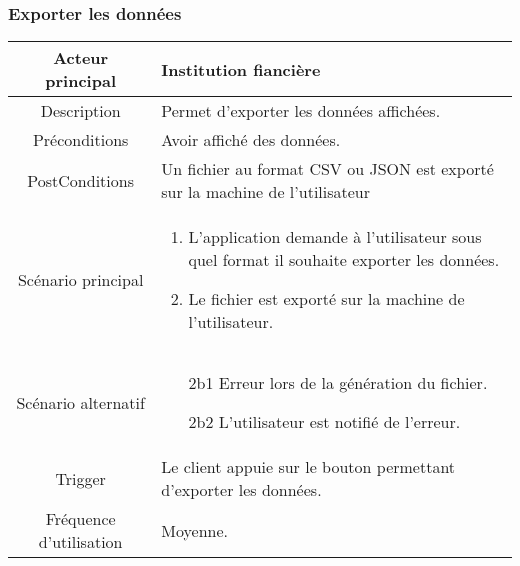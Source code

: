 \documentclass{article}
\begin{document}
\newpage

\subsubsection{Exporter les données}
\begin{table}[h]
   \begin{tabular}{|c|p{10cm}|}
      \hline
      Acteur principal&Institution fiancière\\
      \hline
      Description&Permet d'exporter les données affichées.\\
      \hline
      Préconditions&Avoir affiché des données.\\
      \hline
      PostConditions&Un fichier au format CSV ou JSON est exporté sur la machine de l'utilisateur\\
      \hline
      Scénario principal& 
            \begin{enumerate}
               \item L'application demande à l'utilisateur sous quel format il souhaite exporter les données.
               \item Le fichier est exporté sur la machine de l'utilisateur.
            \end{enumerate}     \\
      \hline
      Scénario alternatif&
            \begin{itemize}
               \item[2b1] Erreur lors de la génération du fichier.
               \item[2b2] L'utilisateur est notifié de l'erreur. 
            \end{itemize}      \\
      \hline
      Trigger&Le client appuie sur le bouton permettant d'exporter les données.\\
      \hline
      Fréquence d'utilisation&Moyenne.\\
      \hline
   \end{tabular}
\end{table}

\newpage
\end{document}
